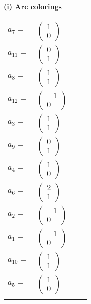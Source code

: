 \documentclass[1p]{elsarticle_modified}
\theoremstyle{definition}
\begin{document}
\flushleft \textbf{(i) Arc colorings}\\
\begin{tabular}{m{7pt} m{180pt} m{7pt} m{180pt} }
\flushright $a_{7}=$&$\begin{pmatrix}1\\0\end{pmatrix}$ \\
\flushright $a_{11}=$&$\begin{pmatrix}0\\1\end{pmatrix}$ \\
\flushright $a_{8}=$&$\begin{pmatrix}1\\1\end{pmatrix}$ \\
\flushright $a_{12}=$&$\begin{pmatrix}-1\\0\end{pmatrix}$ \\
\flushright $a_{3}=$&$\begin{pmatrix}1\\1\end{pmatrix}$ \\
\flushright $a_{9}=$&$\begin{pmatrix}0\\1\end{pmatrix}$ \\
\flushright $a_{4}=$&$\begin{pmatrix}1\\0\end{pmatrix}$ \\
\flushright $a_{6}=$&$\begin{pmatrix}2\\1\end{pmatrix}$ \\
\flushright $a_{2}=$&$\begin{pmatrix}-1\\0\end{pmatrix}$ \\
\flushright $a_{1}=$&$\begin{pmatrix}-1\\0\end{pmatrix}$ \\
\flushright $a_{10}=$&$\begin{pmatrix}1\\1\end{pmatrix}$ \\
\flushright $a_{5}=$&$\begin{pmatrix}1\\0\end{pmatrix}$\\&\end{tabular}
\end{document}
